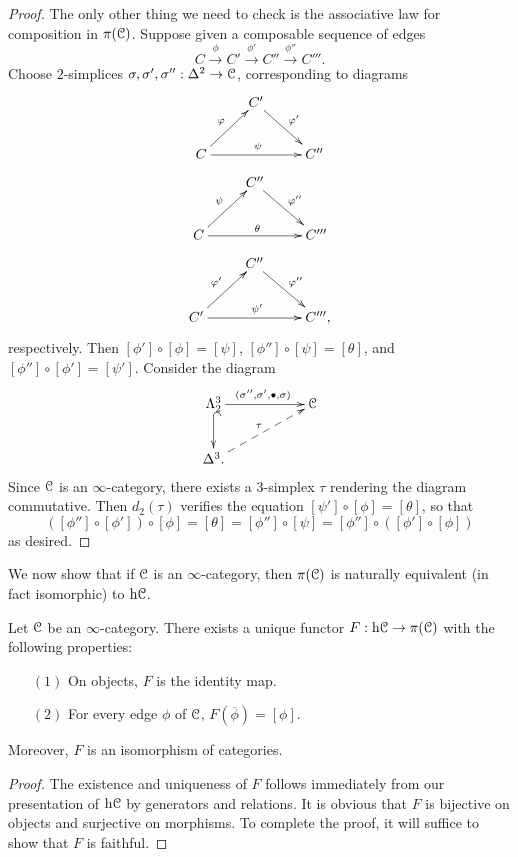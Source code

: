 \begin{1.2.3 The homotopy category}
\begin{proof}
The only other thing we need to check is the associative law for
composition in $\pi(\operatorname{\mathcal{C}})$. Suppose given a composable sequence of edges
$$ C \stackrel{\phi}{\rightarrow} C' \stackrel{\phi'}{\rightarrow} C'' \stackrel{\phi''}{\rightarrow} C'''.$$
Choose $2$-simplices $\sigma, \sigma', \sigma'': \Delta^2 \rightarrow \operatorname{\mathcal{C}}$, corresponding to diagrams
$$ \xymatrix{ & C' \ar[dr]^{\phi'} & \\
C \ar[ur]^{\phi} \ar[rr]^{\psi} & & C'' }$$
$$ \xymatrix{ & C'' \ar[dr]^{\phi''} & \\
C \ar[ur]^{\psi} \ar[rr]^{\theta} & & C''' }$$
$$ \xymatrix{ & C'' \ar[dr]^{\phi''} & \\
C' \ar[ur]^{\phi'} \ar[rr]^{\psi'} & & C''',}$$
respectively. Then $[\phi'] \circ [\phi] = [\psi]$, $[\phi''] \circ [\psi] = [\theta]$, and
$[\phi''] \circ [\phi'] = [\psi']$. Consider the diagram
$$ \xymatrix{
\Lambda^3_2 \ar[rr]^{(\sigma'', \sigma', \bigdot, \sigma)} \ar@{^{(}->}[d] & & \calC \\
\Delta^3. \ar@{-->}[urr]^{\tau} & & }$$
Since $\operatorname{\mathcal{C}}$ is an $\infty$-category, there exists a $3$-simplex $\tau$ rendering the diagram commutative. Then $d_2(\tau)$ verifies the equation
$[\psi'] \circ [\phi] = [\theta]$, so that
$$([\phi''] \circ [\phi']) \circ [\phi] = [\theta] = [\phi''] \circ
[\psi] = [\phi''] \circ ([\phi'] \circ [\phi])$$ as desired.
\end{proof}

We now show that if $\operatorname{\mathcal{C}}$ is an $\infty$-category, then $\pi(\operatorname{\mathcal{C}})$ is
naturally equivalent (in fact isomorphic) to $\rm{h} \it{\operatorname{\mathcal{C}}}$.

\begin{proposition}
Let $\operatorname{\mathcal{C}}$ be an $\infty$-category. There exists a unique functor $F: \rm{h} \it{\operatorname{\mathcal{C}}} \rightarrow \pi(\operatorname{\mathcal{C}})$ with the following properties:
\begin{itemize}
\item[$(1)$] On objects, $F$ is the identity map.
\item[$(2)$] For every edge $\phi$ of $\operatorname{\mathcal{C}}$, $F( \overline{\phi} ) = [\phi]$.
\end{itemize}
Moreover, $F$ is an isomorphism of categories.
\end{proposition}

\begin{proof}
The existence and uniqueness of $F$ follows immediately from our presentation
of $\rm{h} \it{\operatorname{\mathcal{C}}}$ by generators and relations. It is obvious that $F$ is bijective on objects and surjective on morphisms. To complete the proof, it will suffice to show that $F$ is faithful.


\end{proof}
\end{1.2.3 The homotopy category}
